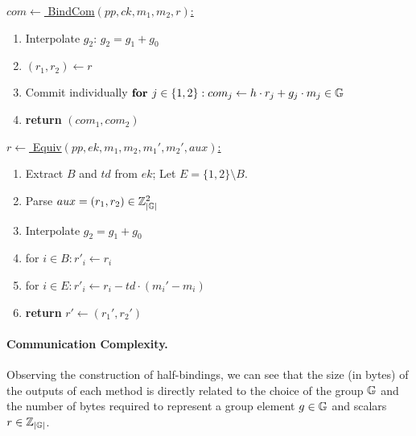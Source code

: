 \begin{breakablefig}
    \underline{$com \leftarrow$ BindCom$(pp,ck, m_1,m_2, r)$:}
    \begin{enumerate}
      \item Interpolate $g_2$: $g_2 = g_1 + g_0$
      \item $(r_1, r_2) \leftarrow r$
      \item Commit individually $\textbf{for } j \in \{1,2\}: com_j \leftarrow h\cdot r_j + g_j \cdot m_j \in \mathbb{G}$
      \item \textbf{return} $(com_1,com_2)$
    \end{enumerate}

    \underline{$r \leftarrow$ Equiv$(pp, ek, m_1, m_2, m_1', m_2', aux)$:}
    \begin{enumerate}
      \item Extract $B$ and $td$ from $ek$; Let $E = \{1,2\} \setminus B$.
      \item Parse $aux = (r_1, r_2) \in \mathbb{Z}_{|\mathbb{G}|}^2$
      \item Interpolate $g_2 = g_1 + g_0$
      \item for $i \in B: r'_i \leftarrow r_i$
      \item for $i \in E: r'_i \leftarrow r_i - td \cdot (m_i' - m_i)$
      \item \textbf{return} $r' \leftarrow (r_1', r_2')$
    \end{enumerate}
\end{breakablefig}

  \paragraph*{Communication Complexity.} Observing the construction of half-bindings, we can see that the size (in bytes) of the outputs of each method 
  is directly related to the choice of the group $\mathbb{G}$ and the number of bytes required to represent a group element $g \in \mathbb{G}$ and scalars $r \in \mathbb{Z}_{|\mathbb{G}|}$. 
  
  
